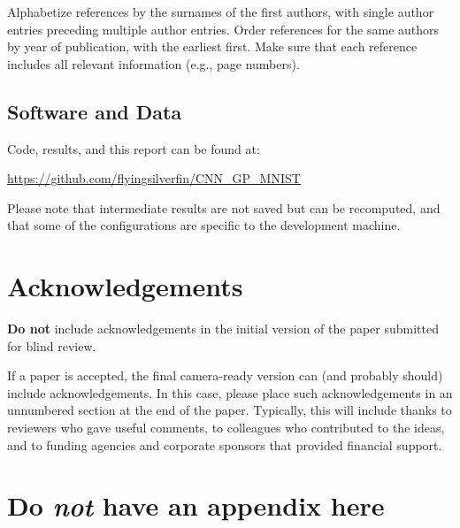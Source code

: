 \documentclass{article}
\begin{document}
Alphabetize references by the surnames of the first authors, with
single author entries preceding multiple author entries. Order
references for the same authors by year of publication, with the
earliest first. Make sure that each reference includes all relevant
information (e.g., page numbers).


\subsection{Software and Data}

Code, results, and this report can be found at:

\url{https://github.com/flyingsilverfin/CNN_GP_MNIST}

Please note that intermediate results are not saved but can be recomputed, and that some of the configurations are specific to the development machine. %

\section*{Acknowledgements}

\textbf{Do not} include acknowledgements in the initial version of
the paper submitted for blind review.

If a paper is accepted, the final camera-ready version can (and
probably should) include acknowledgements. In this case, please
place such acknowledgements in an unnumbered section at the
end of the paper. Typically, this will include thanks to reviewers
who gave useful comments, to colleagues who contributed to the ideas,
and to funding agencies and corporate sponsors that provided financial
support.


\nocite{langley00}






\appendix
\section{Do \emph{not} have an appendix here}
\end{document}
